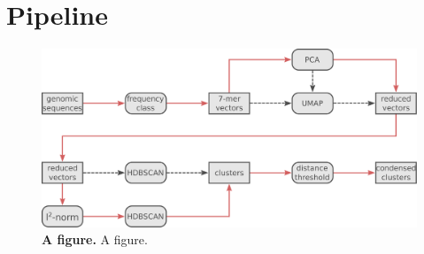 \section{Pipeline} \label{sec:2.1}

\blindtext

\begin{figure}[!hbt]
    \caption[A figure]{\textbf{A figure.} A figure.}
    \label{fig:2.1.1}
    \includegraphics[width=\dimexpr\textwidth-2\fboxsep-2\fboxrule,fbox]{Extra_Graphics/Pipeline_V2.pdf}
\end{figure}